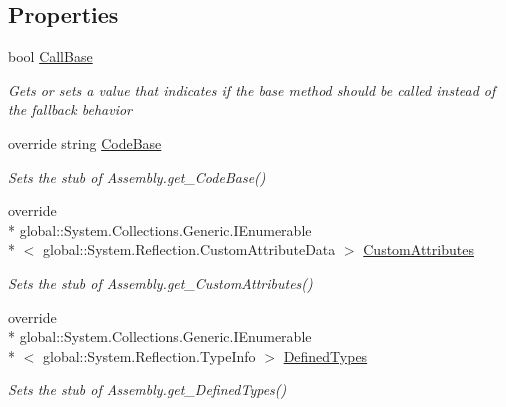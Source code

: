 \subsection*{Properties}
\begin{DoxyCompactItemize}
\item 
bool \hyperlink{class_system_1_1_reflection_1_1_fakes_1_1_stub_assembly_a3ea4d528fb98d2cfd1396c37aeea2250}{Call\-Base}
\begin{DoxyCompactList}\small\item\em Gets or sets a value that indicates if the base method should be called instead of the fallback behavior\end{DoxyCompactList}\item 
override string \hyperlink{class_system_1_1_reflection_1_1_fakes_1_1_stub_assembly_ae060674d09f2c0158723564eb775c783}{Code\-Base}
\begin{DoxyCompactList}\small\item\em Sets the stub of Assembly.\-get\-\_\-\-Code\-Base()\end{DoxyCompactList}\item 
override \\*
global\-::\-System.\-Collections.\-Generic.\-I\-Enumerable\\*
$<$ global\-::\-System.\-Reflection.\-Custom\-Attribute\-Data $>$ \hyperlink{class_system_1_1_reflection_1_1_fakes_1_1_stub_assembly_aac534c52db3ef006504858a77f0b1666}{Custom\-Attributes}
\begin{DoxyCompactList}\small\item\em Sets the stub of Assembly.\-get\-\_\-\-Custom\-Attributes()\end{DoxyCompactList}\item 
override \\*
global\-::\-System.\-Collections.\-Generic.\-I\-Enumerable\\*
$<$ global\-::\-System.\-Reflection.\-Type\-Info $>$ \hyperlink{class_system_1_1_reflection_1_1_fakes_1_1_stub_assembly_a6a9c0b39761e3e3a834d9b7610407967}{Defined\-Types}
\begin{DoxyCompactList}\small\item\em Sets the stub of Assembly.\-get\-\_\-\-Defined\-Types()\end{DoxyCompactList}\item 

\end{DoxyCompactItemize}
